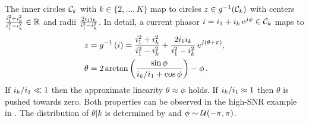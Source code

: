 
The inner circles $\mathcal{C}_k$ with $k \in \{2,\ldots,K\}$ map to circles $z \in g^{-1}(\mathcal{C}_k)$ with centers
$\frac{i_1^2 + i_k^2}{i_1^2 - i_k^2} \in \mathbb{R}$
and radii
$\frac{2 i_1 i_k}{i_1^2 - i_k^2}$.
In detail, a current phasor $i = i_1 + i_k\, e^{j\phi} \in \mathcal{C}_k$ maps to
\begin{align}
z &= g^{-1}\left( i \right)
= \frac{i_1^2 + i_k^2}{i_1^2 - i_k^2} + \frac{2 i_1 i_k}{i_1^2 - i_k^2} \, e^{j(\theta + \pi)}
, \label{eq:z_from_s} \\
\theta &= 2 \arctan\left( \frac{\sin\phi}{i_k  / i_1 + \cos\phi} \right) - \phi
\, . \label{eq:phi_from_phi}
\end{align}
If $i_k / i_1 \ll 1$ then the approximate linearity $\theta \approx \phi$ holds.
If $i_k / i_1 \approx 1$ then $\theta$ is pushed towards zero.
Both properties can be observed in the high-SNR example in .
The distribution of $\theta|k$ is determined by  and
$\phi \sim \mathcal{U}(-\pi,\pi)$.%


